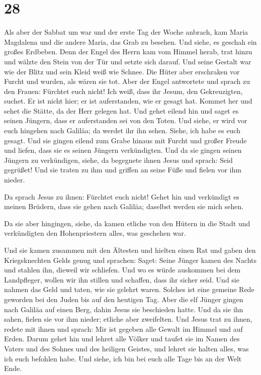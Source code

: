 \hypertarget{section-27}{%
\section{28}\label{section-27}}

 Als aber der Sabbat um war und der erste Tag der Woche
anbrach, kam Maria Magdalena und die andere Maria, das Grab zu besehen.
 Und siehe, es geschah ein großes Erdbeben. Denn der Engel
des Herrn kam vom Himmel herab, trat hinzu und wälzte den Stein von der
Tür und setzte sich darauf.  Und seine Gestalt war wie der
Blitz und sein Kleid weiß wie Schnee.  Die Hüter aber
erschraken vor Furcht und wurden, als wären sie tot.  Aber
der Engel antwortete und sprach zu den Frauen: Fürchtet euch nicht! Ich
weiß, dass ihr Jesum, den Gekreuzigten, suchet.  Er ist
nicht hier; er ist auferstanden, wie er gesagt hat. Kommet her und sehet
die Stätte, da der Herr gelegen hat.  Und gehet eilend hin
und saget es seinen Jüngern, dass er auferstanden sei von den Toten. Und
siehe, er wird vor euch hingehen nach Galiläa; da werdet ihr ihn sehen.
Siehe, ich habe es euch gesagt.  Und sie gingen eilend zum
Grabe hinaus mit Furcht und großer Freude und liefen, dass sie es seinen
Jüngern verkündigten. Und da sie gingen seinen Jüngern zu verkündigen,
 siehe, da begegnete ihnen Jesus und sprach: Seid
gegrüßet! Und sie traten zu ihm und griffen an seine Füße und fielen vor
ihm nieder.

 Da sprach Jesus zu ihnen: Fürchtet euch nicht! Gehet hin
und verkündigt es meinen Brüdern, dass sie gehen nach Galiläa; daselbst
werden sie mich sehen.

 Da sie aber hingingen, siehe, da kamen etliche von den
Hütern in die Stadt und verkündigten den Hohenpriestern alles, was
geschehen war.

 Und sie kamen zusammen mit den Ältesten und hielten
einen Rat und gaben den Kriegsknechten Gelds genug  und
sprachen: Saget: Seine Jünger kamen des Nachts und stahlen ihn, dieweil
wir schliefen.  Und wo es würde auskommen bei dem
Landpfleger, wollen wir ihn stillen und schaffen, dass ihr sicher seid.
 Und sie nahmen das Geld und taten, wie sie gelehrt
waren. Solches ist eine gemeine Rede geworden bei den Juden bis auf den
heutigen Tag.  Aber die elf Jünger gingen nach Galiläa
auf einen Berg, dahin Jesus sie beschieden hatte.  Und da
sie ihn sahen, fielen sie vor ihm nieder; etliche aber zweifelten.
 Und Jesus trat zu ihnen, redete mit ihnen und sprach:
Mir ist gegeben alle Gewalt im Himmel und auf Erden. 
Darum gehet hin und lehret alle Völker und taufet sie im Namen des
Vaters und des Sohnes und des heiligen Geistes,  und
lehret sie halten alles, was ich euch befohlen habe. Und siehe, ich bin
bei euch alle Tage bis an der Welt Ende.
